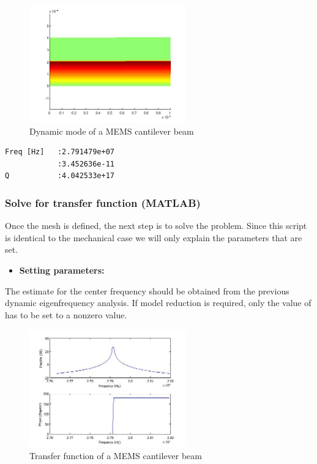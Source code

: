 \begin{figure}
\centering
\includegraphics[height = 2in]{fig/mems_cant_em_dyn.jpg}
\caption{Dynamic mode of a MEMS cantilever beam}
\label{fig:MEMSCantileverBeamEMDynamic}
\end{figure}


\begin{verbatim}
Freq [Hz]   :2.791479e+07
            :3.452636e-11
Q           :4.042533e+17
\end{verbatim}

\clearpage
\subsubsection*{Solve for transfer function  (MATLAB)}
Once the mesh is defined, the next step is to solve the problem.
Since this script is identical to the mechanical case we will only
explain the parameters that are set.
\begin{itemize}

  \item{\textbf{Setting parameters:}}

\end{itemize}
The estimate for the center frequency should be obtained from the
previous dynamic eigenfrequency analysis. If model reduction is
required, only the value of  has to be set to a nonzero value.

\begin{figure}
\centering
\includegraphics[height = 2in]{fig/mems_cant_em_tra.jpg}
\caption{Transfer function of a MEMS cantilever beam}
\label{fig:MEMSCantileverBeamEMTransfer}
\end{figure}



